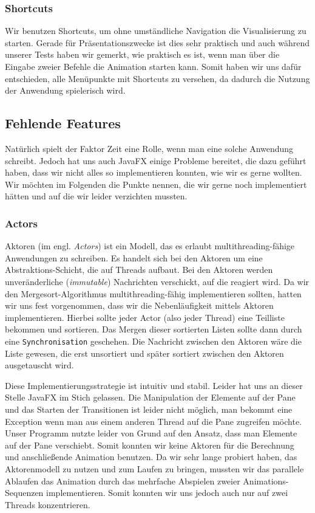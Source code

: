 \subsubsection{Shortcuts}
Wir benutzen Shortcuts, um ohne umständliche Navigation die Visualisierung zu starten. Gerade für Präsentationszwecke ist dies sehr praktisch und auch während unserer Tests haben wir gemerkt, wie praktisch es ist, wenn man über die Eingabe zweier Befehle die Animation starten kann. Somit haben wir uns dafür entschieden, alle Menüpunkte mit Shortcuts zu versehen, da dadurch die Nutzung der Anwendung spielerisch wird.

\subsection{Fehlende Features}
Natürlich spielt der Faktor Zeit eine Rolle, wenn man eine solche Anwendung schreibt. Jedoch hat uns auch JavaFX einige Probleme bereitet, die dazu geführt haben, dass wir nicht alles so implementieren konnten, wie wir es gerne wollten. Wir möchten im Folgenden die Punkte nennen, die wir gerne noch implementiert hätten und auf die wir leider verzichten mussten.

\subsubsection{Actors}\label{sec:probleme-mit-aktoren}
Aktoren (im engl. \textit{Actors}) ist ein Modell, das es erlaubt multithreading-fähige Anwendungen zu schreiben. Es handelt sich bei den Aktoren um eine Abstraktions-Schicht, die auf Threads aufbaut. Bei den Aktoren werden unveränderliche (\textit{immutable}) Nachrichten verschickt, auf die reagiert wird. Da wir den Mergesort-Algorithmus multithreading-fähig implementieren sollten, hatten wir uns fest vorgenommen, dass wir die Nebenläufigkeit mittels Aktoren implementieren. Hierbei sollte jeder Actor (also jeder Thread) eine Teilliste bekommen und sortieren. Das Mergen dieser sortierten Listen sollte dann durch eine \texttt{Synchronisation} geschehen. Die Nachricht zwischen den Aktoren wäre die Liste gewesen, die erst unsortiert und später sortiert zwischen den Aktoren ausgetauscht wird.


Diese Implementierungsstrategie ist intuitiv und stabil. Leider hat uns an dieser Stelle JavaFX im Stich gelassen. Die Manipulation der Elemente auf der Pane und das Starten der Transitionen ist leider nicht möglich, man bekommt eine Exception wenn man aus einem anderen Thread auf die Pane zugreifen möchte. Unser Programm nutzte leider von Grund auf den Ansatz, dass man Elemente auf der Pane verschiebt. Somit konnten wir keine Aktoren für die Berechnung und anschließende Animation benutzen. Da wir sehr lange probiert haben, das Aktorenmodell zu nutzen und zum Laufen zu bringen, mussten wir das parallele Ablaufen das Animation durch das mehrfache Abspielen zweier Animations-Sequenzen implementieren. Somit konnten wir uns jedoch auch nur auf zwei Threads konzentrieren.


